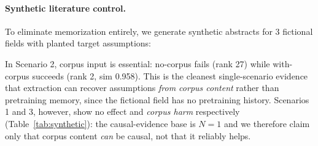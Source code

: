 \documentclass[11pt]{article}
\begin{document}
\begin{table}[t]
\centering
\caption{Corpus-alignment ablation (GPT-4o, clean prompt, $\text{seed}{=}42$). A \emph{wrong} corpus does not merely fail to help --- it actively destroys the recovery that pretraining alone (no corpus) achieves. The 4/4\,$\rightarrow$\,0/12 collapse across all $4 \times 3$ cross-pairings is direct evidence that corpus content causally enters extraction.}
\label{tab:wrongcorpus}
\footnotesize
\setlength{\tabcolsep}{4pt}
\end{table}

\paragraph{Synthetic literature control.}
To eliminate memorization entirely, we generate synthetic abstracts for 3 fictional fields with planted target assumptions:

\begin{table}[t]
\centering
\caption{Synthetic literature control: 3 fictional fields with planted assumptions. \emph{Post-hoc, exploratory}; causal evidence rests on $N{=}1$ scenario.}
\label{tab:synthetic}
\footnotesize
\setlength{\tabcolsep}{4pt}
\end{table}

In Scenario 2, corpus input is essential: no-corpus fails (rank 27) while with-corpus succeeds (rank 2, sim 0.958). This is the cleanest single-scenario evidence that extraction can recover assumptions \emph{from corpus content} rather than pretraining memory, since the fictional field has no pretraining history. Scenarios 1 and 3, however, show no effect and \emph{corpus harm} respectively (Table~\ref{tab:synthetic}): the causal-evidence base is $N{=}1$ and we therefore claim only that corpus content \emph{can} be causal, not that it reliably helps.
\end{document}
